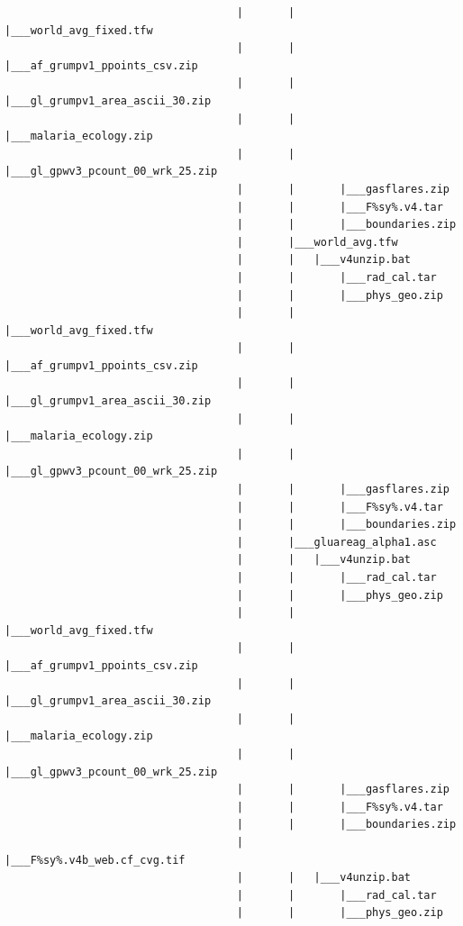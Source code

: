 \documentclass[
]{book}
\begin{document}
\begin{verbatim}
                                    |       |       |___world_avg_fixed.tfw
                                    |       |       |___af_grumpv1_ppoints_csv.zip
                                    |       |       |___gl_grumpv1_area_ascii_30.zip
                                    |       |       |___malaria_ecology.zip
                                    |       |       |___gl_gpwv3_pcount_00_wrk_25.zip
                                    |       |       |___gasflares.zip
                                    |       |       |___F%sy%.v4.tar
                                    |       |       |___boundaries.zip
                                    |       |___world_avg.tfw
                                    |       |   |___v4unzip.bat
                                    |       |       |___rad_cal.tar
                                    |       |       |___phys_geo.zip
                                    |       |       |___world_avg_fixed.tfw
                                    |       |       |___af_grumpv1_ppoints_csv.zip
                                    |       |       |___gl_grumpv1_area_ascii_30.zip
                                    |       |       |___malaria_ecology.zip
                                    |       |       |___gl_gpwv3_pcount_00_wrk_25.zip
                                    |       |       |___gasflares.zip
                                    |       |       |___F%sy%.v4.tar
                                    |       |       |___boundaries.zip
                                    |       |___gluareag_alpha1.asc
                                    |       |   |___v4unzip.bat
                                    |       |       |___rad_cal.tar
                                    |       |       |___phys_geo.zip
                                    |       |       |___world_avg_fixed.tfw
                                    |       |       |___af_grumpv1_ppoints_csv.zip
                                    |       |       |___gl_grumpv1_area_ascii_30.zip
                                    |       |       |___malaria_ecology.zip
                                    |       |       |___gl_gpwv3_pcount_00_wrk_25.zip
                                    |       |       |___gasflares.zip
                                    |       |       |___F%sy%.v4.tar
                                    |       |       |___boundaries.zip
                                    |       |___F%sy%.v4b_web.cf_cvg.tif
                                    |       |   |___v4unzip.bat
                                    |       |       |___rad_cal.tar
                                    |       |       |___phys_geo.zip

\end{verbatim}
\end{document}
